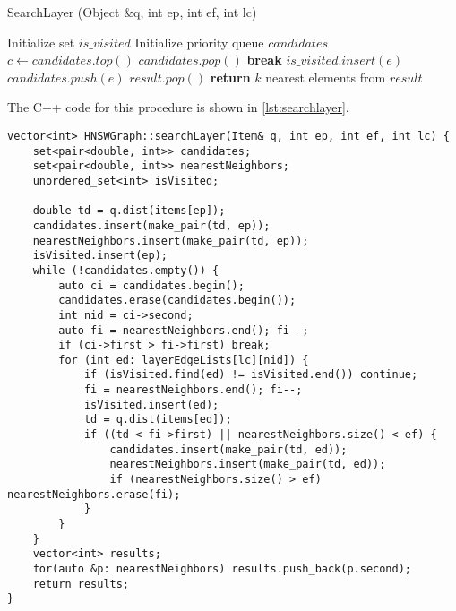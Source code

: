 \documentclass[sigconf, nonacm]{acmart}
\begin{document}
\begin{algorithm}[H]
\caption{SearchLayer (Object \&q, int ep, int ef, int lc)} %
\label{alg:searchlayer} %
\begin{algorithmic}[1] %
\State Initialize set $is\_visited$
\State Initialize priority queue $candidates$
    \State $c \gets candidates.top()$ 
    \State $candidates.pop()$
        \State \textbf{break}
    \EndIf
            \State $is\_visited.insert(e)$
                \State $candidates.push(e)$
            \EndIf
        \EndIf
    \EndFor
        \State $result.pop()$
    \EndIf
\EndWhile
\State \textbf{return} $k$ nearest elements from $result$ 
\end{algorithmic}
\end{algorithm}

The C++ code for this procedure is shown in \ref{lst:searchlayer}.

\begin{lstlisting}[caption={HNSWGraph::searchLayer}, label={lst:searchlayer}]
vector<int> HNSWGraph::searchLayer(Item& q, int ep, int ef, int lc) {
    set<pair<double, int>> candidates;
    set<pair<double, int>> nearestNeighbors;
    unordered_set<int> isVisited;

    double td = q.dist(items[ep]);
    candidates.insert(make_pair(td, ep));
    nearestNeighbors.insert(make_pair(td, ep));
    isVisited.insert(ep);
    while (!candidates.empty()) {
        auto ci = candidates.begin();
        candidates.erase(candidates.begin());
        int nid = ci->second;
        auto fi = nearestNeighbors.end(); fi--;
        if (ci->first > fi->first) break;
        for (int ed: layerEdgeLists[lc][nid]) {
            if (isVisited.find(ed) != isVisited.end()) continue;
            fi = nearestNeighbors.end(); fi--;
            isVisited.insert(ed);
            td = q.dist(items[ed]);
            if ((td < fi->first) || nearestNeighbors.size() < ef) {
                candidates.insert(make_pair(td, ed));
                nearestNeighbors.insert(make_pair(td, ed));
                if (nearestNeighbors.size() > ef)  nearestNeighbors.erase(fi);
            }
        }
    }
    vector<int> results;
    for(auto &p: nearestNeighbors) results.push_back(p.second);
    return results;
}
\end{lstlisting}
\end{document}
